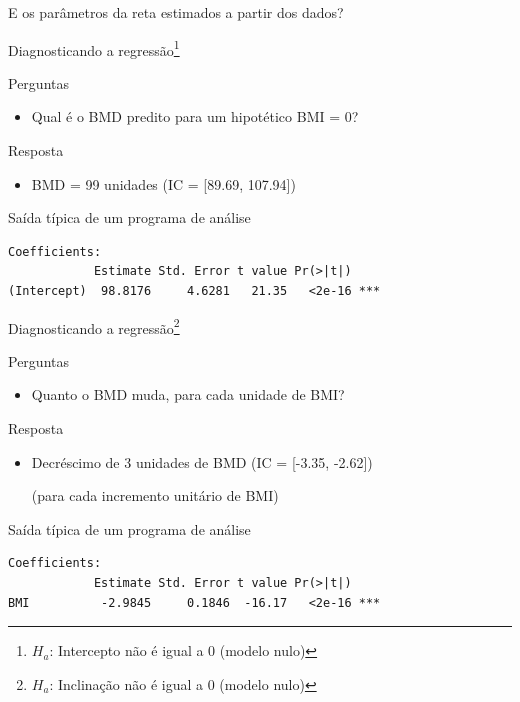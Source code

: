 \documentclass{beamer}
\begin{document}
\begin{frame}
  \begin{center}
    E os parâmetros da reta estimados a partir dos dados?
  \end{center}
\end{frame}

\begin{frame}[fragile]{Diagnosticando a regressão\footnote{$H_a$: Intercepto não é igual a 0 (modelo nulo)}}
  \begin{block}{Perguntas}
    \begin{itemize}
      \footnotesize
    \item Qual é o BMD predito para um hipotético BMI = 0?
    \end{itemize}
  \end{block}
  \bigskip
  \begin{exampleblock}{Resposta}
    \begin{itemize}
    \item BMD = 99 unidades \footnotesize (IC = [89.69, 107.94])
    \end{itemize}
  \end{exampleblock}
  \vfill
  \begin{exampleblock}{Saída típica de um programa de análise}
    \scriptsize
\begin{verbatim}
Coefficients:
            Estimate Std. Error t value Pr(>|t|)    
(Intercept)  98.8176     4.6281   21.35   <2e-16 ***
\end{verbatim}
\end{exampleblock}
\end{frame}

\begin{frame}[fragile]{Diagnosticando a regressão\footnote{$H_a$: Inclinação não é igual a 0 (modelo nulo)}}
  \begin{block}{Perguntas}
    \begin{itemize}
      \footnotesize
    \item Quanto o BMD muda, para cada unidade de BMI?
    \end{itemize}
  \end{block}
  \bigskip
    \begin{exampleblock}{Resposta}
      \begin{itemize}
      \item Decréscimo de 3 unidades de BMD \footnotesize (IC = [-3.35, -2.62])

        \bigskip
        \scriptsize (para cada incremento unitário de BMI)
    \end{itemize}
  \end{exampleblock}
  \vfill
  \begin{exampleblock}{Saída típica de um programa de análise}
    \scriptsize
\begin{verbatim}
Coefficients:
            Estimate Std. Error t value Pr(>|t|)    
BMI          -2.9845     0.1846  -16.17   <2e-16 ***
\end{verbatim}
\end{exampleblock}
\end{frame}
\end{document}
